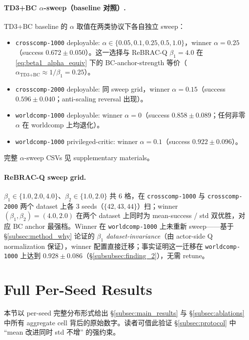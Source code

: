 \paragraph{TD3+BC $\alpha$-sweep（baseline 对照）.}\quad
TD3+BC \citep{fujimoto2021td3bc} baseline 的 $\alpha$ 取值在两类协议下各自独立 sweep：
\begin{itemize}
    \item \texttt{crosscomp-1000} deployable: $\alpha \in \{0.05, 0.1, 0.25, 0.5, 1.0\}$，winner $\alpha=0.25$（success $0.672 \pm 0.050$）。这一选择与 ReBRAC-Q $\beta_1 = 4.0$ 在 \eqref{eq:beta1_alpha_equiv} 下的 BC-anchor-strength 等价（$\alpha_{\text{TD3+BC}} \approx 1/\beta_1 = 0.25$）。
    \item \texttt{crosscomp-2000} deployable: 同 sweep grid，winner $\alpha=0.15$（success $0.596 \pm 0.040$；anti-scaling reversal 出现）。
    \item \texttt{worldcomp-1000} deployable: winner $\alpha=0$（success $0.858 \pm 0.089$；任何非零 $\alpha$ 在 worldcomp 上均退化）。
    \item \texttt{worldcomp-1000} privileged-critic: winner $\alpha=0.1$（success $0.922 \pm 0.096$）。
\end{itemize}
完整 $\alpha$-sweep CSVs 见 supplementary materials。

\paragraph{ReBRAC-Q sweep grid.}\quad
$\beta_1 \in \{1.0, 2.0, 4.0\}$、$\beta_2 \in \{1.0, 2.0\}$ 共 6 格，在 \texttt{crosscomp-1000} 与 \texttt{crosscomp-2000} 两个 dataset 上各 3 seeds（$\{42, 43, 44\}$）扫；winner $(\beta_1, \beta_2) = (4.0, 2.0)$ 在两个 dataset 上同时为 mean-success / std 双优胜，对应 BC anchor 最强档。Winner 在 \texttt{worldcomp-1000} 上未重新 sweep——基于 \S\ref{subsec:method_why} 论证的 \emph{$\beta_1$ dataset-invariance}（由 actor-side Q normalization 保证），winner 配置直接迁移；事实证明这一迁移在 \texttt{worldcomp-1000} 上达到 $0.928 \pm 0.086$（\S\ref{subsubsec:finding_2}），无需 retune。

\section{Full Per-Seed Results}\label{app:full_tables}

本节以 per-seed 完整分布形式给出 \S\ref{subsec:main_results} 与 \S\ref{subsec:ablations} 中所有 aggregate cell 背后的原始数字。读者可借此验证 \S\ref{subsec:protocol} 中 ``mean 改进同时 std 不增'' 的强约束。

